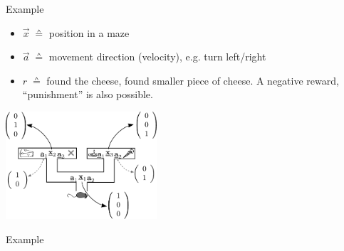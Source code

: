 \begin{frame}{Example}

\begin{itemize}
\item $\vec x \; \corresponds$ position in a maze
\item $\vec a \; \corresponds$ movement direction (velocity), e.g. turn left/right
\item $r \; \corresponds$ found the cheese, found smaller piece of cheese. A negative reward, ``punishment'' is also possible.
\end{itemize}



\begin{center}
	\includegraphics[height=4cm]{img/mouse_labyrinth_actions}
\end{center}

\end{frame}


\begin{frame}{Example}
    

\end{frame}

